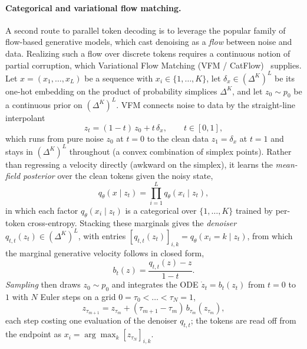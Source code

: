\documentclass[twocolumn]{style}
\begin{document}
\paragraph{Categorical and variational flow matching.} A second route to parallel token decoding is to leverage the popular family of flow-based generative models, which cast denoising as a \emph{flow} between noise and data. Realizing such a flow over discrete tokens requires a continuous notion of partial corruption, which Variational Flow Matching (VFM / CatFlow)~\citep{eijkelboom2024vfm} supplies. Let $x=(x_1,\dots,x_L)$ be a sequence with $x_i\in\{1,\dots,K\}$, let $\delta_x\in(\Delta^K)^L$ be its one-hot embedding on the product of probability simplices $\Delta^K$, and let $z_0\sim p_0$ be a continuous prior on $(\Delta^K)^L$. VFM connects noise to data by the straight-line interpolant
\begin{equation}
z_t=(1-t)\,z_0+t\,\delta_x,\qquad t\in[0,1],
\label{eq:interp}
\end{equation}
which runs from pure noise $z_0$ at $t{=}0$ to the clean data $z_1=\delta_x$ at $t{=}1$ and stays in $(\Delta^K)^L$ throughout (a convex combination of simplex points). Rather than regressing a velocity directly (awkward on the simplex), it learns the \emph{mean-field posterior} over the clean tokens given the noisy state,
\begin{equation}
q_\theta(x\mid z_t)=\textstyle\prod_{i=1}^{L} q_\theta(x_i\mid z_t),
\label{eq:posterior}
\end{equation}
in which each factor $q_\theta(x_i\mid z_t)$ is a categorical over $\{1,\dots,K\}$ trained by per-token cross-entropy. Stacking these marginals gives the \emph{denoiser} $q_{t,t}(z_t)\in(\Delta^K)^L$, with entries $[q_{t,t}(z_t)]_{i,k}=q_\theta(x_i{=}k\mid z_t)$, from which the marginal generative velocity follows in closed form,
\begin{equation}
b_t(z)=\frac{q_{t,t}(z)-z}{1-t}.
\label{eq:velocity}
\end{equation}
\emph{Sampling} then draws $z_0\sim p_0$ and integrates the ODE $\dot z_t=b_t(z_t)$ from $t{=}0$ to $1$ with $N$ Euler steps on a grid $0=\tau_0<\dots<\tau_N=1$,
\begin{equation}
z_{\tau_{m+1}}=z_{\tau_m}+(\tau_{m+1}-\tau_m)\,b_{\tau_m}(z_{\tau_m}),
\label{eq:euler}
\end{equation}
each step costing one evaluation of the denoiser $q_{t,t}$; the tokens are read off from the endpoint as $x_i=\arg\max_k[z_{\tau_N}]_{i,k}$.
\end{document}
